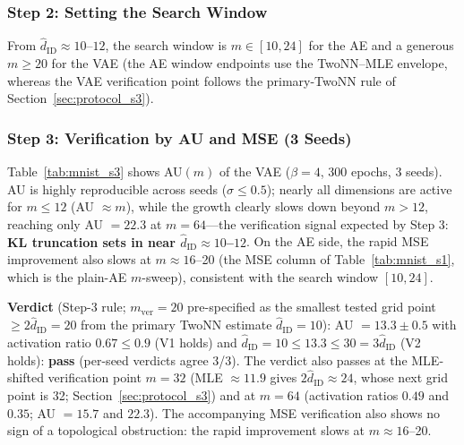 \documentclass[make,article,submit,pdftex,moreauthors]{Definitions/mdpi}
\newcommand{\hatdID}{\hat{d}_{\mathrm{ID}}}
\begin{document}
\subsubsection{Step 2: Setting the Search Window}

From $\hatdID \approx 10$--$12$, the search window is $m \in [10, 24]$
for the AE and a generous $m \geq 20$ for the VAE
(the AE window endpoints use the TwoNN--MLE envelope, whereas the VAE
verification point follows the primary-TwoNN rule of
Section~\ref{sec:protocol_s3}).

\subsubsection{Step 3: Verification by AU and MSE (3 Seeds)}

Table~\ref{tab:mnist_s3} shows AU$(m)$ of the VAE ($\beta = 4$, 300 epochs,
3 seeds).
AU is highly reproducible across seeds ($\sigma \leq 0.5$); nearly all
dimensions are active for $m \leq 12$ (AU $\approx m$), while the growth
clearly slows down beyond $m > 12$, reaching only AU $= 22.3$ at
$m = 64$---the verification signal expected by Step 3:
\textbf{KL truncation sets in near $\hatdID \approx 10$--$12$}.
On the AE side, the rapid MSE improvement also slows at
$m \approx 16$--20 (the MSE column of Table~\ref{tab:mnist_s1}, which is the
plain-AE $m$-sweep), consistent with the search window $[10, 24]$.

\textbf{Verdict} (Step-3 rule; $m_{\mathrm{ver}} = 20$ pre-specified as
the smallest tested grid point $\geq 2\hatdID = 20$ from the primary TwoNN
estimate $\hatdID = 10$): AU $= 13.3 \pm 0.5$ with
activation ratio $0.67 \leq 0.9$ (V1 holds) and
$\hatdID = 10 \leq 13.3 \leq 30 = 3\hatdID$ (V2 holds): \textbf{pass}
(per-seed verdicts agree 3/3).
The verdict also passes at the MLE-shifted verification point $m = 32$
(MLE $\approx 11.9$ gives $2\hatdID \approx 24$, whose next grid point is
32; Section~\ref{sec:protocol_s3}) and at $m = 64$
(activation ratios $0.49$ and $0.35$; AU $= 15.7$ and $22.3$).
The accompanying MSE verification also shows no sign of a topological
obstruction: the rapid improvement slows at $m \approx 16$--20.
\end{document}
